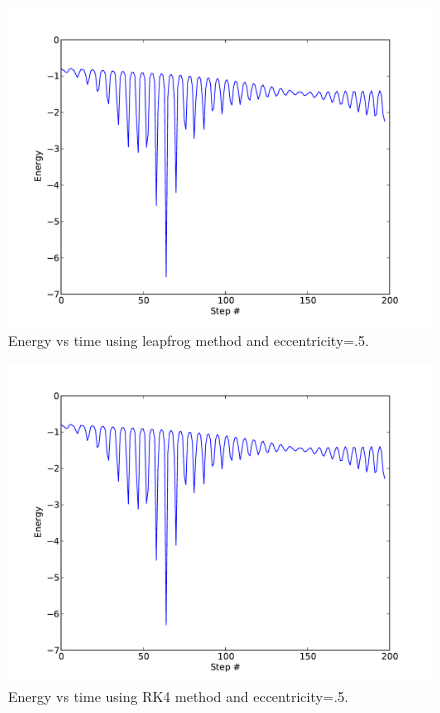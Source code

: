 \documentclass[a4paper,11pt]{article}
\begin{document}
\begin{figure}[h!]
\begin{center}
\includegraphics[scale=.7]{E_T_5lf.pdf}
\caption{Energy vs time using leapfrog method and eccentricity=.5.}
\end{center}
\end{figure}

\begin{figure}[h!]
\begin{center}
\includegraphics[scale=.7]{E_T_5rk4.pdf}
\caption{Energy vs time using RK4 method and eccentricity=.5.}
\end{center}
\end{figure}
\end{document}

